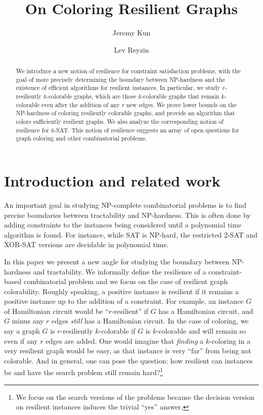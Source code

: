 \documentclass{llncs}
\title{On Coloring Resilient Graphs}
\author{Jeremy Kun \and Lev Reyzin}
\institute{
Department of Mathematics, Statistics, and Computer Science\\
University of Illinois at Chicago,
Chicago, IL 60607\\
\texttt{\{jkun2,lreyzin\}@math.uic.edu}
}
\date{}
\begin{document}
\maketitle

\begin{abstract} 
We introduce a new notion of resilience for constraint satisfaction problems,
with the goal of more precisely determining the boundary between NP-hardness
and the existence of efficient algorithms for resilient instances.  In
particular, we study $r$-resiliently $k$-colorable graphs, which are those
$k$-colorable graphs that remain $k$-colorable even after the addition of any
$r$ new edges.  We prove lower bounds on the NP-hardness of coloring
resiliently colorable graphs, and provide an algorithm that colors sufficiently
resilient graphs.  We also analyze the corresponding notion of resilience for $k$-SAT.
This notion of resilience suggests an array of open
questions for graph coloring and other combinatorial problems.
\end{abstract}

\section{Introduction and related work}

An important goal in studying NP-complete combinatorial problems is to find
precise boundaries between tractability and NP-hardness. This is often done by
adding constraints to the instances being considered until a polynomial time
algorithm is found.  For instance, while SAT is NP-hard, the restricted $2$-SAT
and XOR-SAT versions are decidable in polynomial time.  

In this paper we present a new angle for studying the boundary between
NP-hardness and tractability.  We informally define the resilience of a
constraint-based combinatorial problem and we focus on the case of resilient
graph colorability. Roughly speaking, a positive instance is resilient if it
remains a positive instance up to the addition of a constraint. For example, an
instance $G$ of Hamiltonian circuit would be ``$r$-resilient'' if $G$ has a
Hamiltonian circuit, and $G$ minus any $r$ edges \emph{still} has a Hamiltonian
circuit. In the case of coloring, we say a graph $G$ is $r$-resiliently
$k$-colorable if $G$ is $k$-colorable and will remain so even if any $r$ edges
are added. One would imagine that \emph{finding} a $k$-coloring in a very
resilient graph would be easy, as that instance is very ``far'' from being not
colorable.  And in general, one can pose the question: how resilient can
instances be and have the search problem still remain hard?\footnote{We focus
on the search versions of the problems because the decision version on
resilient instances induces the trivial ``yes'' answer.}
\end{document}
